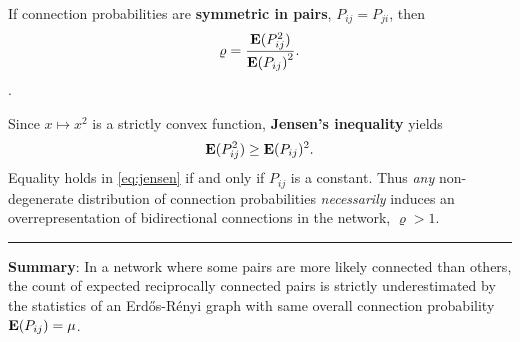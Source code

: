 If connection probabilities are \textbf{symmetric in pairs}, $P_{ij} = P_{ji}$, then
\begin{align}
\varrho = \frac{\E(P_{ij}^2)}{{\E\left(P_{ij}\right)}^2}.
\end{align}.

Since $x \mapsto x^2$ is a strictly convex function, \textbf{Jensen's inequality} \cite{Jensen1906} yields
\begin{align}
\operatorname{\mathbf{E}}(P_{ij}^2) \geq \operatorname{\mathbf{E}}(P_{ij})^2. \label{eq:jensen}
\end{align}
Equality holds in \eqref{eq:jensen} if and only if $P_{ij}$ is a constant. Thus \textit{any} non-degenerate distribution of connection probabilities \textit{necessarily} induces an overrepresentation of bidirectional connections in the network, $\varrho > 1$.

\begin{center}
  \rule{19cm}{2pt}
\end{center}

\textcolor{gblue}{\textbf{Summary}}: In a network where some pairs are more likely connected than others, the count of expected reciprocally connected pairs is strictly underestimated by the statistics of an Erd\H{o}s-R\'{e}nyi graph with same overall connection probability $\operatorname{\mathbf{E}}(P_{ij}) = \mu$.

